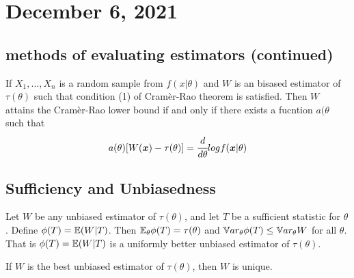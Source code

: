 \section{December 6, 2021}
\subsection{methods of evaluating estimators (continued)}
\begin{corollary}
    If $X_1,...,X_n$ is a random sample from $f(x|\theta)$ and $W$ is an bisased estimator of $\tau(\theta)$ such that condition (1) of Cram\`er-Rao theorem is satisfied. Then $W$ attains the   Cram\`er-Rao lower bound if and only if there exists a fucntion $a(\theta$ such that
    $$
    a(\theta)[W(\boldsymbol{x}) - \tau(\theta)] = \cfrac{d}{d \theta} log f(\boldsymbol{x}|\theta)
    $$
\end{corollary}
\subsection{Sufficiency and Unbiasedness}
\begin{theorem}
    Let $W$ be any unbiased estimator of $\tau(\theta)$, and let $T$ be a sufficient statistic for $\theta$. Define $\phi(T) = \mathbb E(W|T)$. Then $\mathbb E_{\theta}\phi(T) = \tau(\theta)$ and 
    $\mathbb V ar_{\theta}\phi(T) \leq \mathbb V ar_{\theta} W $ for all $\theta$. That is $\phi(T) = \mathbb E(W|T)$ is a uniformly better unbiased estimator of $\tau(\theta)$.
\end{theorem}
\begin{theorem}
    If $W$ is the best unbiased estimator of $\tau(\theta)$, then $W$ is unique. 
\end{theorem}